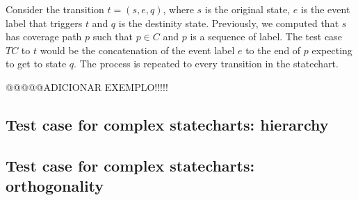 Consider the transition $t = (s,e,q)$, where $s$ is the original state, $e$ is the event label that triggers $t$ and $q$ is the destinity state. Previously, we computed that $s$ has coverage path $p$ such that $p \in C$ and $p$ is a sequence of label. The test case $TC$ to $t$ would be the concatenation of the event label $e$ to the end of $p$ expecting to get to state $q$. The process is repeated to every transition in the statechart.

@@@@@ADICIONAR EXEMPLO!!!!!

\subsection{Test case for complex statecharts: hierarchy}

\subsection{Test case for complex statecharts: orthogonality}
